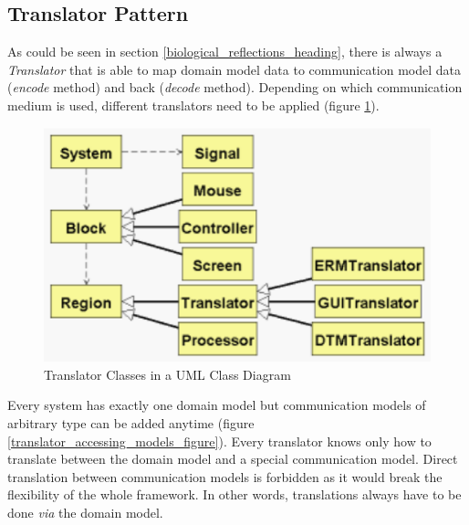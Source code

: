 %
%
%
%
%
%
%

\subsection{Translator Pattern}
\label{translator_pattern_heading}

As could be seen in section \ref{biological_reflections_heading}, there is always
a \emph{Translator} that is able to map domain model data to communication model
data (\emph{encode} method) and back (\emph{decode} method). Depending on which
communication medium is used, different translators need to be applied (figure
\ref{translator_classes_figure}).

\begin{figure}[ht]
    \begin{center}
        \includegraphics[scale=0.3]{vector/translator_classes.eps}
        \caption{Translator Classes in a UML Class Diagram}
        \label{translator_classes_figure}
    \end{center}
\end{figure}

Every system has exactly one domain model but communication models of arbitrary
type can be added anytime (figure \ref{translator_accessing_models_figure}). Every
translator knows only how to translate between the domain model and a special
communication model. Direct translation between communication models is forbidden
as it would break the flexibility of the whole framework. In other words,
translations always have to be done \emph{via} the domain model.

